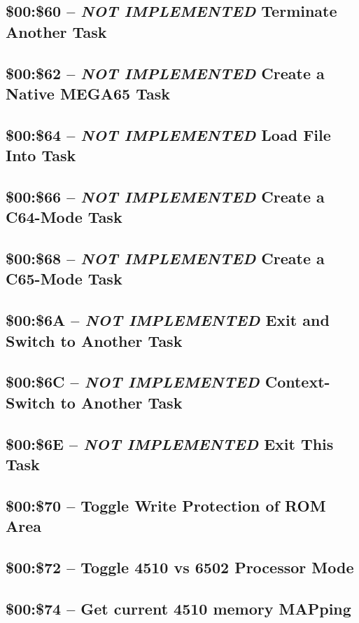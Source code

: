 \subsection{\$00:\$60 -- {\em NOT IMPLEMENTED} Terminate Another Task}
\subsection{\$00:\$62 -- {\em NOT IMPLEMENTED} Create a Native MEGA65 Task}
\subsection{\$00:\$64 -- {\em NOT IMPLEMENTED} Load File Into Task}
\subsection{\$00:\$66 -- {\em NOT IMPLEMENTED} Create a C64-Mode Task}
\subsection{\$00:\$68 -- {\em NOT IMPLEMENTED} Create a C65-Mode Task}
\subsection{\$00:\$6A -- {\em NOT IMPLEMENTED} Exit and Switch to Another Task}
\subsection{\$00:\$6C -- {\em NOT IMPLEMENTED} Context-Switch to Another Task}
\subsection{\$00:\$6E -- {\em NOT IMPLEMENTED} Exit This Task}

\subsection{\$00:\$70 -- Toggle Write Protection of ROM Area}
\subsection{\$00:\$72 -- Toggle 4510 vs 6502 Processor Mode}
\subsection{\$00:\$74 -- Get current 4510 memory MAPping}

